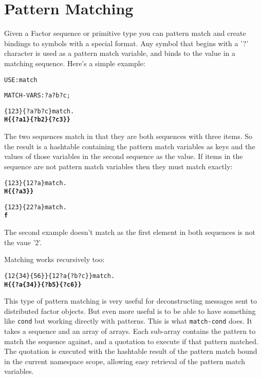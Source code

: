 \chapter{Pattern Matching}\label{patternmatching}

Given a Factor sequence or primitive type you can pattern match and
create bindings to symbols with a special format. Any symbol that
begins with a '?' character is used as a pattern match variable, and
binds to the value in a matching sequence. Here's a simple example:


\begin{alltt}
USE: match

MATCH-VARS: ?a ?b ?c ;

\{ 1 2 3 \} \{ ?a ?b ?c \} match . 
  \textbf{H\{ \{ ?a 1 \} \{ ?b 2 \} \{ ?c 3 \} \}}
\end{alltt}

The two sequences match in that they are both sequences with three
items. So the result is a hashtable containing the pattern match
variables as keys and the values of those variables in the second
sequence as the value. If items in the sequence are not pattern match
variables then they must match exactly:

\begin{alltt}
\{ 1 2 3 \} \{ 1 2 ?a \} match .
  \textbf{H\{ \{ ?a 3 \} \}}

\{ 1 2 3 \} \{ 2 2 ?a \} match .
  \textbf{f}
\end{alltt}


The second example doesn't match as the first element in both
sequences is not the vaue '2'.

Matching works recursively too:

\begin{alltt}
\{ 1 2 \{ 3 4 \} \{ 5 6 \} \} \{ 1 2 ?a \{ ?b ?c \} \} match .
  \textbf{H\{ \{ ?a \{ 3 4 \} \} \{ ?b 5 \} \{ ?c 6 \} \}}
\end{alltt}


This type of pattern matching is very useful for deconstructing
messages sent to distributed factor objects. But even more useful is
to be able to have something like \verb|cond| but working directly with
patterns. This is what \verb|match-cond| does. It takes a sequence and an
array of arrays. Each sub-array contains the pattern to match the
sequence against, and a quotation to execute if that pattern
matched. The quotation is executed with the hashtable result of the
pattern match bound in the current namespace scope, allowing easy
retrieval of the pattern match variables.

